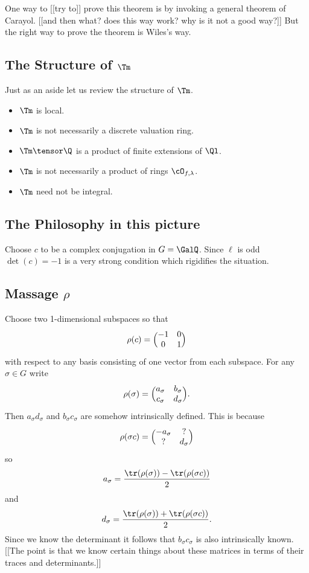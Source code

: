 \documentclass{report}
\begin{document}
One way to [[try to]] prove this theorem is by invoking a general
theorem of Carayol. [[and then what? does this way work? why is it not
a good way?]]
But the right way to prove the theorem is Wiles's way.

\subsection{The Structure of $\Tm$}
Just as an aside let us review the structure of $\Tm$.
\begin{itemize}
\item $\Tm$ is local.
\item $\Tm$ is not necessarily a discrete valuation ring.
\item $\Tm\tensor\Q$ is a product of finite extensions of $\Ql$.
\item $\Tm$ is not necessarily a product of rings $\cO_{f,\lambda}$.
\item $\Tm$ need not be integral.
\end{itemize}

\subsection{The Philosophy in this picture}
Choose $c$ to be a complex conjugation in $G=\GalQ$.
Since $\ell$ is odd $\det(c)=-1$ is a
very strong condition which rigidifies the situation.

\subsection{Massage $\rho$}
Choose two 1-dimensional subspaces so that
$$\rho(c)=\Bigl(\begin{matrix}-1&0\\0&1\end{matrix}\Bigr)$$
with respect to any basis consisting of one vector from
each subspace.
For any $\sigma\in G$ write
$$\rho(\sigma)=
     \Bigl(
        \begin{matrix}
            a_{\sigma} & b_{\sigma}\\
            c_{\sigma} & d_{\sigma}
        \end{matrix}
     \Bigr).$$
Then $a_{\sigma}d_{\sigma}$ and $b_{\sigma}c_{\sigma}$ are somehow
intrinsically defined. This is because
$$\rho(\sigma c)=
     \Bigl(
        \begin{matrix}
            -a_{\sigma} & ?\\
            ? & d_{\sigma}
        \end{matrix}
     \Bigr)$$
so
$$a_{\sigma}=\frac{\tr(\rho(\sigma))-\tr(\rho(\sigma{}c))}{2}$$
and
$$d_{\sigma}=\frac{\tr(\rho(\sigma))+\tr(\rho(\sigma{}c))}{2}.$$
Since we know the determinant it follows that
$b_{\sigma}c_{\sigma}$ is also
intrinsically known.
[[The point is that we know certain things about
these matrices in terms of their traces and determinants.]]
\end{document}
